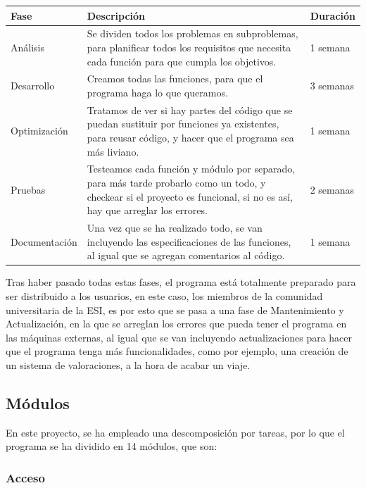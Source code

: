 \begin{tabular}{|p{2.7cm}|p{8.2cm}|p{1.8cm}|}
  \hline
  \textbf{Fase} & \textbf{Descripción} & \textbf{Duración} \\
  \hline
  Análisis & Se dividen todos los problemas en subproblemas, para planificar todos los requisitos que necesita cada función para que cumpla los objetivos. & 1 semana \\
  \hline
  Desarrollo & Creamos todas las funciones, para que el programa haga lo que queramos. & 3 semanas \\
  \hline
  Optimización & Tratamos de ver si hay partes del código que se puedan sustituir por funciones ya existentes, para reusar código, y hacer que el programa sea más liviano. & 1 semana \\
  \hline
  Pruebas & Testeamos cada función y módulo por separado, para más tarde probarlo como un todo, y checkear si el proyecto es funcional, si no es así, hay que arreglar los errores. & 2 semanas \\
  \hline
  Documentación & Una vez que se ha realizado todo, se van incluyendo las especificaciones de las funciones, al igual que se agregan comentarios al código. & 1 semana \\
  \hline
\end{tabular}

\bigskip

Tras haber pasado todas estas fases, el programa está totalmente preparado para ser distribuido a los usuarios, en este caso, los miembros de la comunidad universitaria de la ESI,
es por esto que se pasa a una fase de Mantenimiento y Actualización, en la que se arreglan los errores que pueda tener el programa en las máquinas externas,
al igual que se van incluyendo actualizaciones para hacer que el programa tenga más funcionalidades, como por ejemplo, una creación de un sistema de valoraciones, a la hora de acabar un viaje.

\subsection{Módulos}

En este proyecto, se ha empleado una descomposición por tareas, por lo que el programa se ha dividido en 14 módulos, que son:

\subsubsection{Acceso}

